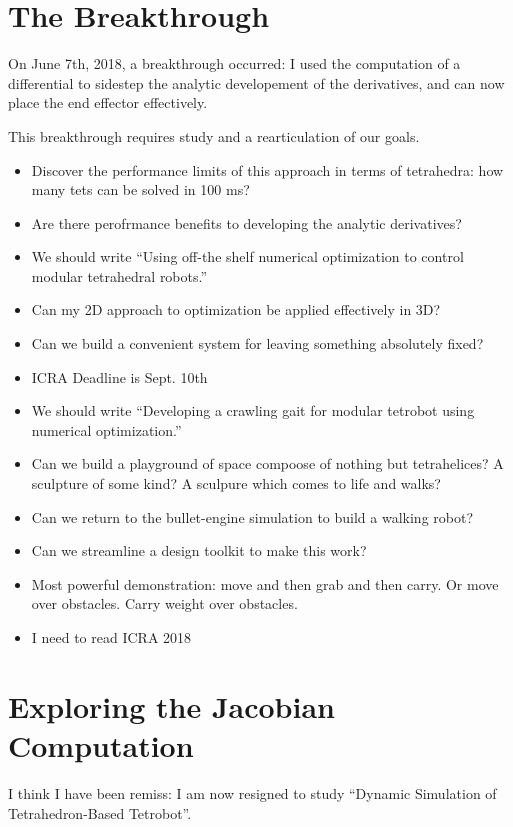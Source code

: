 \documentclass[11pt]{article}
\begin{document}
\section{The Breakthrough}

On June 7th, 2018, a breakthrough occurred: I used the computation of a differential to sidestep the analytic developement
of the derivatives, and can now place the end effector effectively.

This breakthrough requires study and a rearticulation of our goals.

\begin{itemize}
\item Discover the performance limits of this approach in terms of tetrahedra: how many tets can be solved in 100 ms?
  \item Are there perofrmance benefits to developing the analytic derivatives?
  \item We should write ``Using off-the shelf numerical optimization to control modular tetrahedral robots.''
  \item Can my 2D approach to optimization be applied effectively in 3D?
  \item Can we build a convenient system for leaving something absolutely fixed?
    
  \item ICRA Deadline is Sept. 10th
  \item We should write ``Developing a crawling gait for modular tetrobot using numerical optimization.''
  \item Can we build a playground of space compoose of nothing but tetrahelices? A sculpture of some kind? A sculpure which comes to life and walks?
  \item Can we return to the bullet-engine simulation to build a walking robot?
  \item Can we streamline a design toolkit to make this work?
  \item Most powerful demonstration: move and then grab and then carry. Or move over obstacles. Carry weight over obstacles.
  \item I need to read ICRA 2018
    
  \end{itemize}

\section{Exploring the Jacobian Computation}

I think I have been remiss: I am now resigned to study ``Dynamic Simulation of Tetrahedron-Based Tetrobot''.
\end{document}
